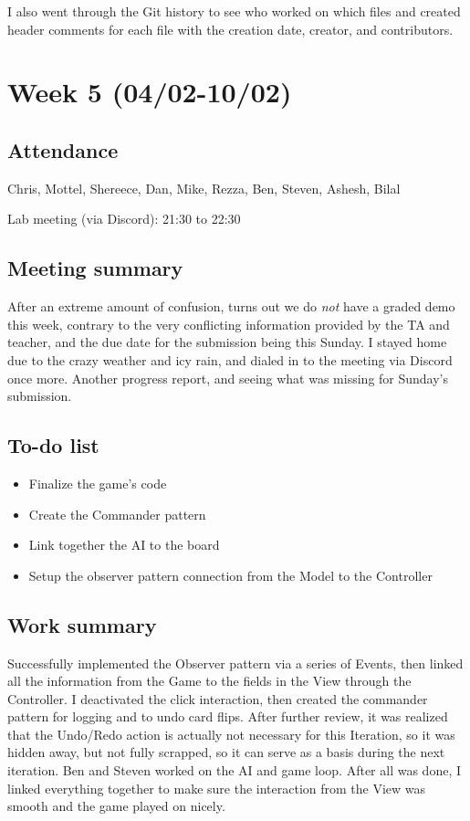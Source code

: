 \documentclass[letterpaper,10pt]{article}
\begin{document}
I also went through the Git history to see who worked on which files and created header comments for each file with the creation date, creator, and contributors.

\pagebreak


\section{Week 5 (04/02-10/02)}

\subsection{Attendance}
Chris, Mottel, Shereece, Dan, Mike, Rezza, Ben, Steven, Ashesh, Bilal

\noindent Lab meeting (via Discord): 21:30 to 22:30

\subsection{Meeting summary}
After an extreme amount of confusion, turns out we do \textit{not} have a graded demo this week, contrary to the very conflicting information provided by the TA and teacher, and the due date for the submission being this Sunday. I stayed home due to the crazy weather and icy rain, and dialed in to the meeting via Discord once more. Another progress report, and seeing what was missing for Sunday's submission.

\subsection{To-do list}
\begin{itemize}
\item Finalize the game's code
\item Create the Commander pattern
\item Link together the AI to the board
\item Setup the observer pattern connection from the Model to the Controller
\end{itemize}

\subsection{Work summary}
Successfully implemented the Observer pattern via a series of Events, then linked all the information from the Game to the fields in the View through the Controller. I deactivated the click interaction, then created the commander pattern for logging and to undo card flips. After further review, it was realized that the Undo/Redo action is actually not necessary for this Iteration, so it was hidden away, but not fully scrapped, so it can serve as a basis during the next iteration. Ben and Steven worked on the AI and game loop. After all was done, I linked everything together to make sure the interaction from the View was smooth and the game played on nicely.
\end{document}
